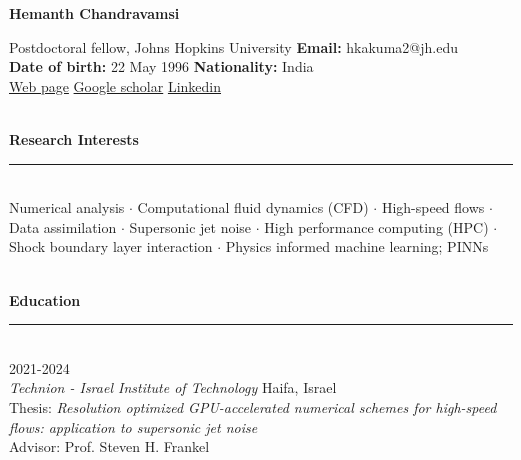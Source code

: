 

\begin{center}
    {\bf \Large{Hemanth Chandravamsi}}\\[6mm]
\end{center}

\noindent Postdoctoral fellow, Johns Hopkins University \hfill \textbf{Email:} hkakuma2@jh.edu \\
{\textbf{Date of birth:} 22 May 1996}  \hfill {\textbf{Nationality:} India}\\[1mm]

\noindent \faPiedPiper{} \href{https://hemanthgrylls.github.io/}{Web page} \hfill %
\faGraduationCap{} \href{https://scholar.google.com/citations?user=fM2UaHoAAAAJ&hl=en}{Google scholar} \hfill       %
\faLinkedin{} \href{https://www.linkedin.com/in/hemanth-chandravamsi-6863078b/}{Linkedin}   %



\ \\[2mm]
\noindent \textbf{\large{Research Interests}}\\[-2.5mm]
\noindent\rule{\textwidth}{0.4pt} \\[-2mm]

\noindent Numerical analysis $\cdot$ Computational fluid dynamics (CFD) $\cdot$ High-speed flows $\cdot$ Data assimilation $\cdot$ Supersonic jet noise $\cdot$ High performance computing (HPC) $\cdot$ Shock boundary layer interaction $\cdot$ Physics informed machine learning; PINNs

\ \\[2mm]
\noindent \textbf{\large{Education}}\\[-2.5mm]
\noindent\rule{\textwidth}{0.4pt} \\[-2mm]

 \hfill {2021-2024} \\
\textit{Technion - Israel Institute of Technology} \hfill {Haifa, Israel}\\
Thesis: \textit{Resolution optimized GPU-accelerated numerical schemes for high-speed flows: application to supersonic jet noise} \\
Advisor: Prof. Steven H. Frankel \\[0.5mm]

